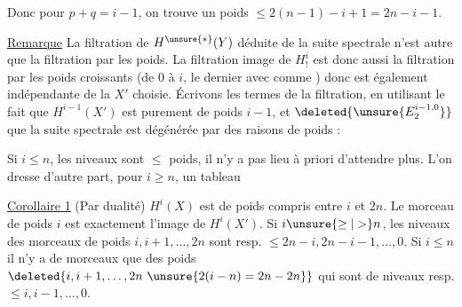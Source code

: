 Donc  pour $p+q=i-1$, on trouve un poids $\le2(n-1)-i+1=2n-i-1$.

\uline{Remarque} La filtration de $H^{\unsure{*}}(Y)$ déduite de la suite spectrale  n'est autre que la filtration par les poids. La filtration image de $H^i_!$ est donc aussi la filtration par les poids croissants (de $0$ à $i$, le dernier avec comme ) donc est également indépendante de la   $X'$ choisie. Écrivons les termes de la filtration, en utilisant le fait que $H^{i-1}(X')$ est purement de poids $i-1$, et $\deleted{\unsure{E^{i-1,0}_2}}$ que la suite spectrale est dégénérée par des raisons de poids :


 Si $i\le n$, les niveaux sont  $\le$ poids, il n'y a pas lieu à priori d'attendre plus. L'on dresse d'autre part, pour $i\ge n$, un tableau


\uline{Corollaire 1} (Par dualité) $H^i(X)$ est de poids compris entre $i$ et $2n$. Le morceau  de poids $i$ est exactement l'image de $H^i(X')$. Si $i\unsure{\ge|>}n$, les niveaux des morceaux de poids $i,i+1,\ldots,2n$ sont resp. $\le2n-i,2n-i-1,\ldots,0$. Si $i\le n$ il n'y a de morceaux  que des poids
$\deleted{i,i+1,\ldots,2n\ \unsure{2(i-n)=2n-2n}}$ 
qui sont de niveaux resp. $\le i,i-1,\ldots,0$.

